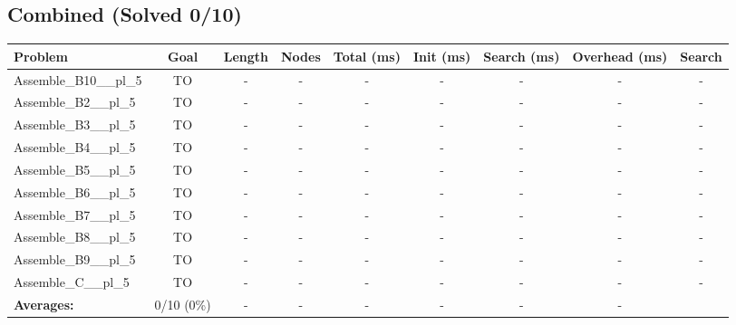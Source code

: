\documentclass{article}
\begin{document}
\subsection*{Combined (Solved 0/10)}
\begin{tabular}{lcccccccc}
\toprule
Problem & Goal & Length & Nodes & Total (ms) & Init (ms) & Search (ms) & Overhead (ms) & Search \\
\midrule
Assemble\_B10\_\_pl\_5 & TO & - & - & - & - & - & - & - \\
Assemble\_B2\_\_pl\_5 & TO & - & - & - & - & - & - & - \\
Assemble\_B3\_\_pl\_5 & TO & - & - & - & - & - & - & - \\
Assemble\_B4\_\_pl\_5 & TO & - & - & - & - & - & - & - \\
Assemble\_B5\_\_pl\_5 & TO & - & - & - & - & - & - & - \\
Assemble\_B6\_\_pl\_5 & TO & - & - & - & - & - & - & - \\
Assemble\_B7\_\_pl\_5 & TO & - & - & - & - & - & - & - \\
Assemble\_B8\_\_pl\_5 & TO & - & - & - & - & - & - & - \\
Assemble\_B9\_\_pl\_5 & TO & - & - & - & - & - & - & - \\
Assemble\_C\_\_pl\_5 & TO & - & - & - & - & - & - & - \\
\textbf{Averages:} & 0/10 (0\%) & - & - & - & - & - & - & \\
\bottomrule
\end{tabular}
\\[0.7cm]
\end{document}
